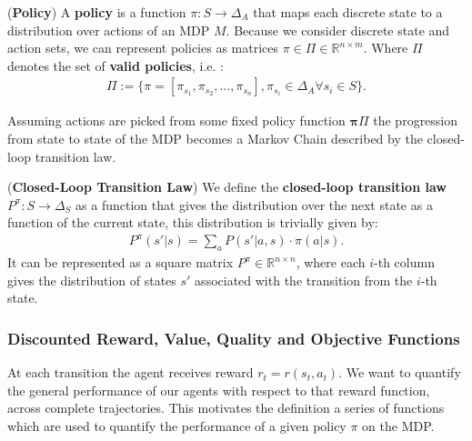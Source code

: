 \begin{definition}
    (\textbf{Policy})
    A \textbf{policy} is a function $\pi:S \rightarrow \Delta_A$ that maps each discrete state to a distribution over actions of an MDP $\textit{M}$. Because we consider discrete state and action sets, we can represent policies as matrices $\pi\in \Pi \in \mathbb{R}^{n \times m}$. Where $\Pi$ denotes the set of \textbf{valid policies}, i.e. : 
    \begin{align*}
        \Pi := \Big\{ \pi = [\pi_{s_1},\pi_{s_2},...,\pi_{s_n}], \pi_{s_i}\in \Delta_A \forall s_i \in S \Big\} .
    \end{align*}
\end{definition}
\noindent
Assuming actions are picked from some fixed policy function $\bm{\pi}\Pi$ the progression from state to state of the MDP becomes a Markov Chain described by the closed-loop transition law.

\begin{definition}
    \label{def:closed_loop_transition_law}
    (\textbf{Closed-Loop Transition Law})
    We define the \textbf{closed-loop transition law} $P^\pi :S \rightarrow \Delta_S$ as a function that gives the distribution over the next state as a function of the current state, this distribution is trivially given by: 
    \begin{align*}
        P^\pi(s'|s) = \sum_a P(s'|a,s) \cdot \pi(a|s).
    \end{align*}
    \noindent
    It can be represented as a square matrix $P^\pi \in \mathbb{R}^{n \times n}$, where each $i$-th column gives the distribution of states $s'$ associated with the transition from the $i$-th state.
\end{definition}

\subsubsection{Discounted Reward, Value, Quality and Objective Functions}

At each transition the agent receives reward $r_t = r(s_t,a_t)$. We want to quantify the general performance of our agents with respect to that reward function, across complete trajectories. This motivates the definition a series of functions which are used to quantify the performance of a given policy $\pi$ on the MDP. 

